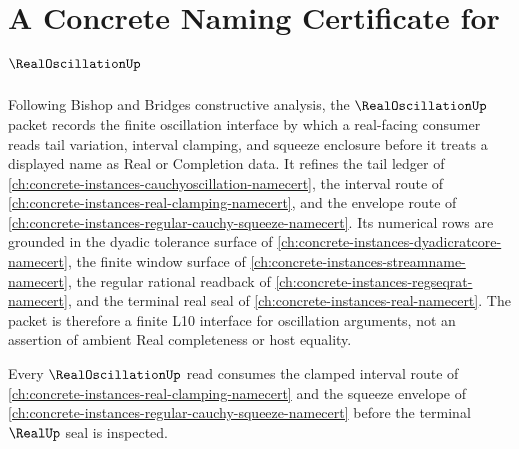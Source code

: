 \chapter{A Concrete Naming Certificate for $\RealOscillationUp$}
\label{ch:concrete-instances-real-oscillation-namecert}

Following Bishop and Bridges constructive analysis, the $\RealOscillationUp$ packet records the finite oscillation interface by which a real-facing consumer reads tail variation, interval clamping, and squeeze enclosure before it treats a displayed name as Real or Completion data. It refines the tail ledger of \autoref{ch:concrete-instances-cauchyoscillation-namecert}, the interval route of \autoref{ch:concrete-instances-real-clamping-namecert}, and the envelope route of \autoref{ch:concrete-instances-regular-cauchy-squeeze-namecert}. Its numerical rows are grounded in the dyadic tolerance surface of \autoref{ch:concrete-instances-dyadicratcore-namecert}, the finite window surface of \autoref{ch:concrete-instances-streamname-namecert}, the regular rational readback of \autoref{ch:concrete-instances-regseqrat-namecert}, and the terminal real seal of \autoref{ch:concrete-instances-real-namecert}. The packet is therefore a finite L10 interface for oscillation arguments, not an assertion of ambient Real completeness or host equality.

Every $\RealOscillationUp$ read consumes the clamped interval route of \autoref{ch:concrete-instances-real-clamping-namecert} and the squeeze envelope of \autoref{ch:concrete-instances-regular-cauchy-squeeze-namecert} before the terminal $\RealUp$ seal is inspected.

